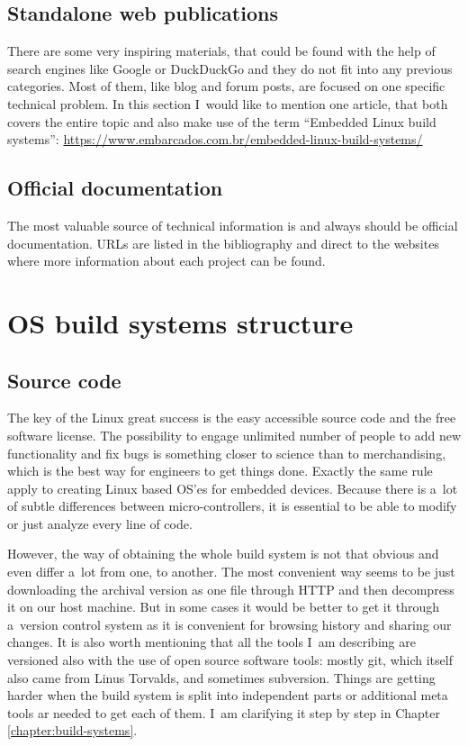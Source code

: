 \documentclass[printmode]{mgr}
\begin{document}
\subsection*{Standalone web publications}

There are some very inspiring materials, that could be found with the help of search engines like Google or DuckDuckGo and they do not fit into any previous categories.
Most of them, like blog and forum posts, are focused on one specific technical problem.
In this section I~would like to mention one article, that both covers the entire topic and also make use of the term ``Embedded Linux build systems'': \url{https://www.embarcados.com.br/embedded-linux-build-systems/}

\subsection*{Official documentation}
The most valuable source of technical information is and always should be official documentation. URLs are listed in the bibliography and direct to the websites where more information about each project can be found.



\section{OS build systems structure}
\label{section:builders-structure}

\subsection*{Source code}

The key of the Linux great success is the easy accessible source code and the free software license. The possibility to engage unlimited number of people to add new functionality and fix bugs is something closer to science than to merchandising, which is the best way for engineers to get things done. Exactly the same rule apply to creating Linux based OS'es for embedded devices. Because there is a~lot of subtle differences between micro-controllers, it is essential to be able to modify or just analyze every line of code.

However, the way of obtaining the whole build system is not that obvious and even differ a~lot from one, to another. The most convenient way seems to be just downloading the archival version as one file through HTTP and then decompress it on our host machine. But in some cases it would be better to get it through a~version control system as it is convenient for browsing history and sharing our changes. It is also worth mentioning that all the tools I~am describing are versioned also with the use of open source software tools: mostly git, which itself also came from Linus Torvalds, and sometimes subversion. Things are getting harder when the build system is split into independent parts or additional meta tools ar needed to get each of them. I~am clarifying it step by step in Chapter \ref{chapter:build-systems}.
\end{document}
